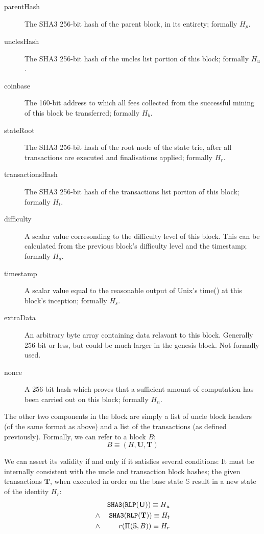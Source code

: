 \documentclass[9pt,oneside]{amsart}
\begin{document}
\begin{multicols}{2}
\begin{description}
\item[parentHash] The SHA3 256-bit hash of the parent block, in its entirety; formally $H_p$.
\item[unclesHash] The SHA3 256-bit hash of the uncles list portion of this block; formally $H_u$.
\item[coinbase] The 160-bit address to which all fees collected from the successful mining of this block be transferred; formally $H_b$.
\item[stateRoot] The SHA3 256-bit hash of the root node of the state trie, after all transactions are executed and finalisations applied; formally $H_r$.
\item[transactionsHash] The SHA3 256-bit hash of the transactions list portion of this block; formally $H_t$.
\item[difficulty] A scalar value corresonding to the difficulty level of this block. This can be calculated from the previous block's difficulty level and the timestamp; formally $H_d$.
\item[timestamp] A scalar value equal to the reasonable output of Unix's time() at this block's inception; formally $H_s$.
\item[extraData] An arbitrary byte array containing data relavant to this block. Generally 256-bit or less, but could be much larger in the genesis block. Not formally used.
\item[nonce] A 256-bit hash which proves that a sufficient amount of computation has been carried out on this block; formally $H_n$.
\end{description}

The other two components in the block are simply a list of uncle block headers (of the same format as above) and a list of the transactions (as defined previously). Formally, we can refer to a block $B$:
\begin{equation}
B \equiv (H, \mathbf{U}, \mathbf{T})
\end{equation}

We can assert its validity if and only if it satisfies several conditions: It must be internally consistent with the uncle and transaction block hashes; the given transactions $\mathbf{T}$, when executed in order on the base state $\mathbb{S}$ result in a new state of the identity $H_r$:
\begin{eqnarray}
& & \mathtt{\tiny SHA3}(\mathtt{\tiny RLP}(\mathbf{U})) \equiv H_u \\
& \wedge & \mathtt{\tiny SHA3}(\mathtt{\tiny RLP}(\mathbf{T})) \equiv H_t \\
& \wedge & r(\Pi(\mathbb{S}, B)) \equiv H_r
\end{eqnarray}


\end{multicols}
\end{document}
